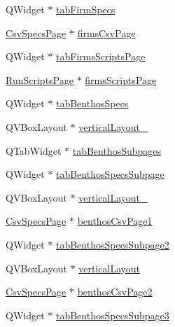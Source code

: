 \begin{DoxyCompactItemize}
\item 
Q\+Widget $\ast$ \mbox{\hyperlink{class_ui___vessel_editor_main_window_a04339aa0e1b8de1a09eed0441bea2f85}{tab\+Firm\+Specs}}
\item 
\mbox{\hyperlink{class_csv_specs_page}{Csv\+Specs\+Page}} $\ast$ \mbox{\hyperlink{class_ui___vessel_editor_main_window_a2bcf17671b04551bd1f7338031862be5}{firms\+Csv\+Page}}
\item 
Q\+Widget $\ast$ \mbox{\hyperlink{class_ui___vessel_editor_main_window_a61d43dd2847fdc01657f8a814d4f2502}{tab\+Firms\+Scripts\+Page}}
\item 
\mbox{\hyperlink{class_run_scripts_page}{Run\+Scripts\+Page}} $\ast$ \mbox{\hyperlink{class_ui___vessel_editor_main_window_a2647911973d5c49ff63a3931f0be13ff}{firms\+Scripts\+Page}}
\item 
Q\+Widget $\ast$ \mbox{\hyperlink{class_ui___vessel_editor_main_window_a8c1e2702c12d26f421b5ae801814535a}{tab\+Benthos\+Specs}}
\item 
Q\+V\+Box\+Layout $\ast$ \mbox{\hyperlink{class_ui___vessel_editor_main_window_a0d2e80b25d50cbffff4dea8d082c2367}{vertical\+Layout\+\_}}
\item 
Q\+Tab\+Widget $\ast$ \mbox{\hyperlink{class_ui___vessel_editor_main_window_a8a0b1689b4001c33d74d36ae308dae66}{tab\+Benthos\+Subpages}}
\item 
Q\+Widget $\ast$ \mbox{\hyperlink{class_ui___vessel_editor_main_window_a6695476b5de25b0293c66117ec3e84c1}{tab\+Benthos\+Specs\+Subpage}}
\item 
Q\+V\+Box\+Layout $\ast$ \mbox{\hyperlink{class_ui___vessel_editor_main_window_ad734b01992b20b8468efaf064e1223b7}{vertical\+Layout\+\_}}
\item 
\mbox{\hyperlink{class_csv_specs_page}{Csv\+Specs\+Page}} $\ast$ \mbox{\hyperlink{class_ui___vessel_editor_main_window_a752480afed2cac4a00a6dc2de3043114}{benthos\+Csv\+Page1}}
\item 
Q\+Widget $\ast$ \mbox{\hyperlink{class_ui___vessel_editor_main_window_a2f1ead2b64ff79de98697be3b6426c19}{tab\+Benthos\+Specs\+Subpage2}}
\item 
Q\+V\+Box\+Layout $\ast$ \mbox{\hyperlink{class_ui___vessel_editor_main_window_a88223c0bf07868f434bb5dcbc276d593}{vertical\+Layout}}
\item 
\mbox{\hyperlink{class_csv_specs_page}{Csv\+Specs\+Page}} $\ast$ \mbox{\hyperlink{class_ui___vessel_editor_main_window_a7c00484b2f058d9c9d148b0d7105c1ab}{benthos\+Csv\+Page2}}
\item 
Q\+Widget $\ast$ \mbox{\hyperlink{class_ui___vessel_editor_main_window_aa9bdfeb9633e721bda809f56cb9cbf7b}{tab\+Benthos\+Specs\+Subpage3}}

\end{DoxyCompactItemize}
